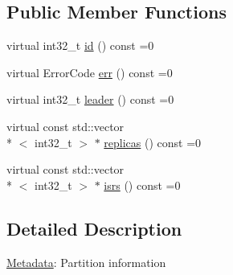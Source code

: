 \subsection*{Public Member Functions}
\begin{DoxyCompactItemize}
\item 
virtual int32\-\_\-t \hyperlink{classRdKafka_1_1PartitionMetadata_a70b1781ddc5ecc3998158ef970b678a0}{id} () const =0
\item 
virtual Error\-Code \hyperlink{classRdKafka_1_1PartitionMetadata_ac7328782aefb58521598ee19ed7857ca}{err} () const =0
\item 
virtual int32\-\_\-t \hyperlink{classRdKafka_1_1PartitionMetadata_aead184554d4e2c57b670b2e07b5592eb}{leader} () const =0
\item 
virtual const std\-::vector\\*
$<$ int32\-\_\-t $>$ $\ast$ \hyperlink{classRdKafka_1_1PartitionMetadata_ae7b6c860ea5d487d23616976cbe1a859}{replicas} () const =0
\item 
virtual const std\-::vector\\*
$<$ int32\-\_\-t $>$ $\ast$ \hyperlink{classRdKafka_1_1PartitionMetadata_acf801e001bec20102cd08119d6d73d88}{isrs} () const =0
\end{DoxyCompactItemize}


\subsection{Detailed Description}
\hyperlink{classRdKafka_1_1Metadata}{Metadata}\-: Partition information 

